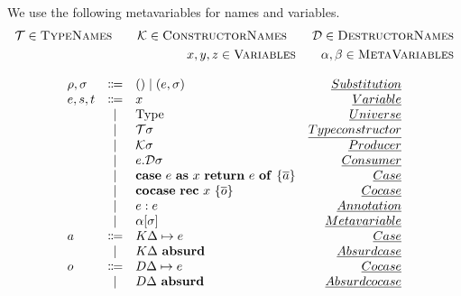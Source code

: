 \begin{definition}
    We use the following metavariables for names and variables.
    \begin{align*}
        \mathcal{T} \in \textsc{TypeNames} \qquad
        \mathcal{K} \in \textsc{ConstructorNames} \qquad
        \mathcal{D} \in \textsc{DestructorNames}  \\
        x,y,z \in \textsc{Variables} \qquad
        \alpha, \beta \in \textsc{MetaVariables} \\
    \end{align*}
\end{definition}

\begin{definition}
\[
\begin{array}{lclr}
    \rho, \sigma &\Coloneqq & () \mid (e,\sigma) & \emph{Substitution} \\
    e,s,t &\Coloneqq & x & \emph{Variable} \\
    & \mid & \text{Type} & \emph{Universe} \\
    & \mid & \mathcal{T}\sigma & \emph{Type constructor} \\
    & \mid & \mathcal{K}\sigma & \emph{Producer} \\
    & \mid & e.\mathcal{D}\sigma & \emph{Consumer} \\
    & \mid & \mathbf{case}\ e\ \mathbf{as}\ x\ \mathbf{return}\ e\  \mathbf{of}\ \{ \overline{a} \} & \emph{Case} \\
    & \mid & \mathbf{cocase}\ \mathbf{rec}\ x\ \{ \overline{o} \} & \emph{Cocase} \\
    & \mid & e : e & \emph{Annotation} \\
    & \mid & \alpha[\sigma] & \emph{Metavariable} \\
    a & \Coloneqq & K\Delta \mapsto e &\emph{Case} \\
    & \mid & K\Delta\ \mathbf{absurd} &\emph{Absurd case} \\
    o & \Coloneqq & D\Delta \mapsto e &\emph{Cocase} \\
    & \mid & D\Delta\ \mathbf{absurd} & \emph{Absurd cocase} \\
\end{array}
\]
\end{definition}

